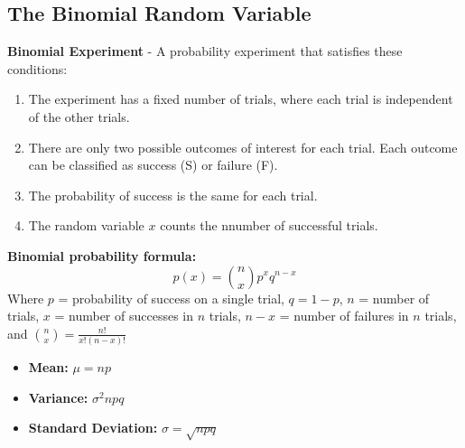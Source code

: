 \documentclass[a4paper]{article}
\let\bf\textbf
\begin{document}
\subsection{The Binomial Random Variable}
\bf{Binomial Experiment} - A probability experiment that satisfies these conditions:
\begin{enumerate}
    \item The experiment has a fixed number of trials, where each trial is independent of the other trials.
    \item There are only two possible outcomes of interest for each trial. Each outcome can be classified as success (S) or failure (F).
    \item The probability of success is the same for each trial.
    \item The random variable $x$ counts the nnumber of successful trials.
\end{enumerate}
\bf{Binomial probability formula:}
\begin{equation}
    p(x) = \binom{n}{x}p^xq^{n-x}
\end{equation}
Where $p$ = probability of success on a single trial, $q = 1 - p$, $n$ = number of trials, $x$ = number of successes in $n$ trials, $n - x$ = number of failures in $n$ trials, and $\displaystyle\binom{n}{x} = \frac{n!}{x!(n-x)!}$
\begin{itemize}
    \item \bf{Mean:} $\displaystyle \mu = np$
    \item \bf{Variance:} $\displaystyle \sigma^2 npq$
    \item \bf{Standard Deviation:} $\displaystyle \sigma = \sqrt{npq}$
\end{itemize}
\newpage
\end{document}
